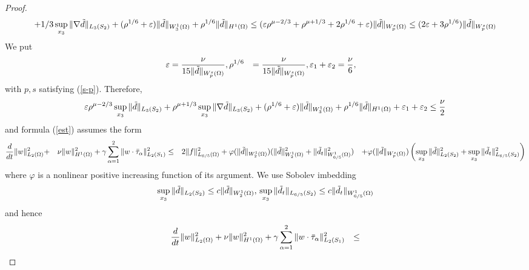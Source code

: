 \documentclass{amsart}
\theoremstyle{plain}
\begin{document}
\begin{proof}
\begin{eqnarray*}
{+1/3}\sup_{x_3}\|{\nabla}{\tilde{d}}\|_{L_{3}(S_2)} +(\rho^{1/6} +
{\varepsilon})\|{\tilde{d}}\|_{W^1_3({\Omega})}  +  \rho^{1/6}\|{\tilde{d}}\|_{H^1({\Omega})} {\hfil\break}
\le ({\varepsilon}\rho^{\mu-2/3} + \rho^{\mu +1/3} + 2 \rho^{1/6}
+{\varepsilon})\|{\tilde{d}}\|_{W^s_p({\Omega})} \le (2{\varepsilon} +
3\rho^{1/6})\|{\tilde{d}}\|_{W^s_p({\Omega})} \end{eqnarray*}
 We put \begin{eqnarray}
\label{eps} \begin{aligned} {\varepsilon} & = \frac{\nu}{15\|{\tilde{d}}\|_{W^s_p({\Omega})}},{\hfil\break}
\rho^{1/6} & = \frac{\nu}{15\|{\tilde{d}}\|_{W^s_p({\Omega})}},{\hfil\break} {\varepsilon}_1+{\varepsilon}_2
& = \frac{\nu}{6},  \end{aligned} \end{eqnarray} with $p, s$ satisfying (\ref{s-p}).
Therefore, \begin{eqnarray*} {\varepsilon} \rho^{\mu-2/3}\sup_{x_3}\|{\tilde{d}}\|_{L_{3}(S_2)}
+ \rho^{\mu +1/3}\sup_{x_3}\|{\nabla}{\tilde{d}}\|_{L_{3}(S_2)} {\hfil\break} +(\rho^{1/6}
+ {\varepsilon})\|{\tilde{d}}\|_{W^1_3({\Omega})}  +  \rho^{1/6}\|{\tilde{d}}\|_{H^1({\Omega})} +
{\varepsilon}_1 + {\varepsilon}_2  \le \frac{\nu}{2} \end{eqnarray*} and formula (\ref{est})
assumes the form \begin{eqnarray*}  \frac{d}{dt} \|w\|_{L_2({\Omega})}^2 & + & \nu
\|w\|_{H^1({\Omega})}^2+ {\gamma}
\sum_{{\alpha}=1}^2\|w\cdot\bar{\tau}_{\alpha}\|_{L_2(S_1)}^2 {\hfil\break} & \le &
2\|f\|_{L_{6/5}({\Omega})}^2 + {\varphi}(\|{\tilde{d}}\|_{W^1_2({\Omega})})
(\|{\tilde{d}}\|_{W^1_2({\Omega})}^2 + \|{\tilde{d}}_t\|_{W^1_{6/5}({\Omega})}^2) {\hfil\break} & & +
{\varphi}(\|{\tilde{d}}\|_{W^s_p({\Omega})})\left(\sup_{x_3}
\|{\tilde{d}}\|^2_{L_{2}(S_2)}+\sup_{x_3}\|{\tilde{d}}_t\|^2_{L_{6/5}(S_2)}\right)
 \end{eqnarray*} where ${\varphi}$ is a nonlinear positive increasing function of
 its argument.
We use Sobolev imbedding  \begin{eqnarray*}
\sup_{x_3} \|{\tilde{d}}\|_{L_{2}(S_2)}\le c \|{\tilde{d}}\|_{W^1_2({\Omega})}, {\hfil\break}
 \sup_{x_3}\|{\tilde{d}}_t\|_{L_{6/5}(S_2)} \le c \|{\tilde{d}}_t\|_{W^1_{6/5}({\Omega})}
\end{eqnarray*} and hence \begin{eqnarray} \label{est-1} \begin{aligned} & \frac{d}{dt}
\|w\|_{L_2({\Omega})}^2 + \nu \|w\|_{H^1({\Omega})}^2+ {\gamma}
\sum_{{\alpha}=1}^2\|w\cdot\bar{\tau}_{\alpha}\|_{L_2(S_1)}^2 {\hfil\break} & \le

\end{aligned}
\end{eqnarray}
\end{proof}
\end{document}
